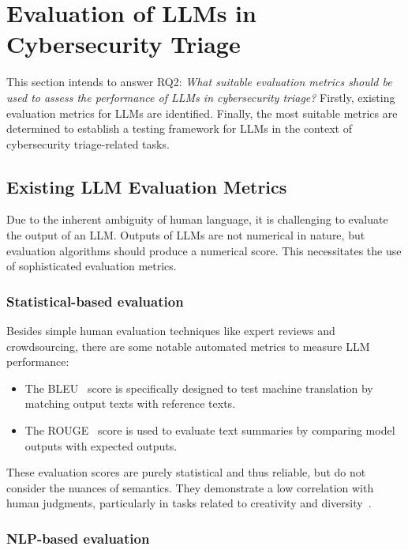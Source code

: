 \section{Evaluation of LLMs in Cybersecurity Triage}
\label{sec:rq2}

This section intends to answer RQ2:
\textit{What suitable evaluation metrics should be used to assess the performance of LLMs in cybersecurity triage?}
Firstly, existing evaluation metrics for LLMs are identified.
Finally, the most suitable metrics are determined to establish a testing framework for LLMs in the context of
cybersecurity triage-related tasks.

\subsection{Existing LLM Evaluation Metrics}
\label{subsec:rq2-existing-metrics}

Due to the inherent ambiguity of human language, it is challenging to evaluate the output of an LLM\@.
Outputs of LLMs are not numerical in nature, but evaluation algorithms should produce a numerical score.
This necessitates the use of sophisticated evaluation metrics.

\subsubsection{Statistical-based evaluation}

Besides simple human evaluation techniques like expert reviews and crowdsourcing, there are some notable automated
metrics to measure LLM performance:
\begin{itemize}
    \item The BLEU\ \citep{papineni2002bleu} score is specifically designed to test machine translation by matching
    output texts with reference texts.

    \item The ROUGE\ \citep{lin2004rouge} score is used to evaluate text summaries by comparing model outputs with
    expected outputs.
\end{itemize}
These evaluation scores are purely statistical and thus reliable, but do not consider the nuances of semantics.
They demonstrate a low correlation with human judgments, particularly in tasks related to creativity and
diversity\ \citep{liu2023gpteval}.

\subsubsection{NLP-based evaluation}


